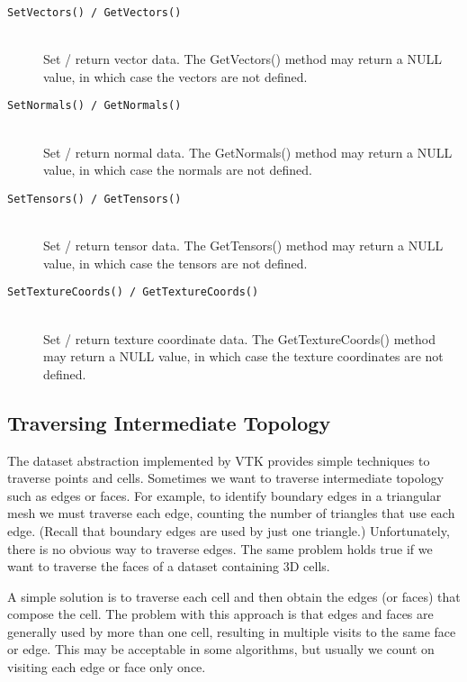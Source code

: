 \begin{description}
\begin{description}
    \item[\texttt{SetVectors() / GetVectors()}] \hfill \\
    Set / return vector data. The GetVectors() method may return a NULL value, in which case the vectors are not defined.

    \item[\texttt{SetNormals() / GetNormals()}] \hfill \\
    Set / return normal data. The GetNormals() method may return a NULL value, in which case the normals are not defined.

    \item[\texttt{SetTensors() / GetTensors()}] \hfill \\
    Set / return tensor data. The GetTensors() method may return a NULL value, in which case the tensors are not defined.

    \item[\texttt{SetTextureCoords() / GetTextureCoords()}] \hfill \\
    Set / return texture coordinate data. The GetTextureCoords() method may return a NULL value, in which case the texture coordinates are not defined.

    \end{description}

\end{description}

\subsection{Traversing Intermediate Topology}

The dataset abstraction implemented by VTK provides simple techniques to traverse points and cells. Sometimes we want to traverse intermediate topology such as edges or faces. For example, to identify boundary edges in a triangular mesh we must traverse each edge, counting the number of triangles that use each edge. (Recall that boundary edges are used by just one triangle.) Unfortunately, there is no obvious way to traverse edges. The same problem holds true if we want to traverse the faces of a dataset containing 3D cells.

A simple solution is to traverse each cell and then obtain the edges (or faces) that compose the cell. The problem with this approach is that edges and faces are generally used by more than one cell, resulting in multiple visits to the same face or edge. This may be acceptable in some algorithms, but usually we count on visiting each edge or face only once.

